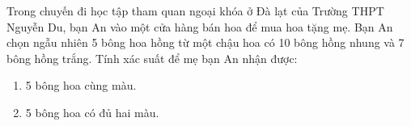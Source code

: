 \begin{bt}%
	Trong chuyến đi học tập tham quan ngoại khóa ở Đà lạt của Trường THPT Nguyễn Du, bạn An vào một cửa hàng bán hoa để mua hoa tặng mẹ. Bạn An chọn ngẫu nhiên 5 bông hoa hồng từ một chậu hoa có 10 bông hồng nhung và 7 bông hồng trắng. Tính xác suất để mẹ bạn An nhận được:
	\begin{multicols}{2}\begin{enumerate}
			\item 5 bông hoa cùng màu.
			\item 5 bông hoa có đủ hai màu.
	\end{enumerate}\end{multicols}
\end{bt}
